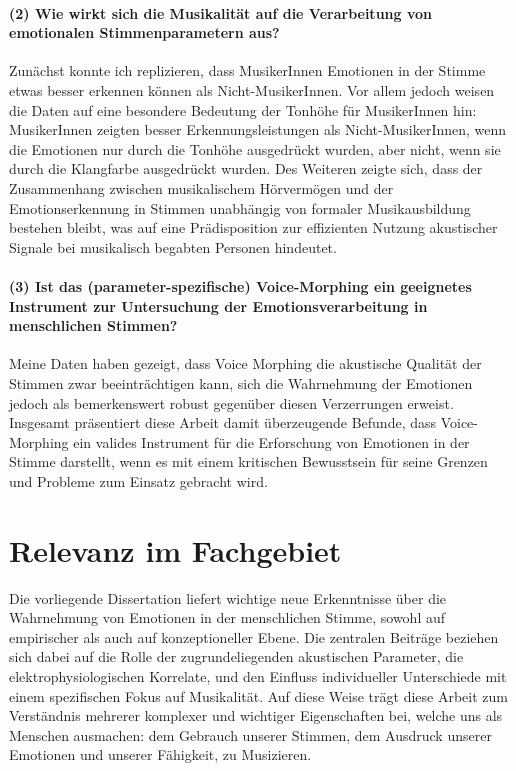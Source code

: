 \documentclass[11pt,a4paper,sans]{moderncv} %
\begin{document}
\paragraph{(2)	Wie wirkt sich die Musikalität auf die Verarbeitung von emotionalen Stimmenparametern aus?}

Zunächst konnte ich replizieren, dass MusikerInnen Emotionen in der Stimme etwas besser erkennen können als Nicht-MusikerInnen. Vor allem jedoch weisen die Daten auf eine besondere Bedeutung der Tonhöhe für MusikerInnen hin: MusikerInnen zeigten besser Erkennungsleistungen als Nicht-MusikerInnen, wenn die Emotionen nur durch die Tonhöhe ausgedrückt wurden, aber nicht, wenn sie durch die Klangfarbe ausgedrückt wurden. Des Weiteren zeigte sich, dass der Zusammenhang zwischen musikalischem Hörvermögen und der Emotionserkennung in Stimmen unabhängig von formaler Musikausbildung bestehen bleibt, was auf eine Prädisposition zur effizienten Nutzung akustischer Signale bei musikalisch begabten Personen hindeutet.

\paragraph{(3)	Ist das (parameter-spezifische) Voice-Morphing ein geeignetes Instrument zur Untersuchung der Emotionsverarbeitung in menschlichen Stimmen?}

Meine Daten haben gezeigt, dass Voice Morphing die akustische Qualität der Stimmen zwar beeinträchtigen kann, sich die Wahrnehmung der Emotionen jedoch als bemerkenswert robust gegenüber diesen Verzerrungen erweist. Insgesamt präsentiert diese Arbeit damit überzeugende Befunde, dass Voice-Morphing ein valides Instrument für die Erforschung von Emotionen in der Stimme darstellt, wenn es mit einem kritischen Bewusstsein für seine Grenzen und Probleme zum Einsatz gebracht wird.

\section{Relevanz im Fachgebiet}

Die vorliegende Dissertation liefert wichtige neue Erkenntnisse über die Wahrnehmung
von Emotionen in der menschlichen Stimme, sowohl auf empirischer als auch auf konzeptioneller
Ebene. Die zentralen Beiträge beziehen sich dabei auf die Rolle der zugrundeliegenden akustischen
Parameter, die elektrophysiologischen Korrelate, und den Einfluss individueller Unterschiede mit
einem spezifischen Fokus auf Musikalität. Auf diese Weise trägt diese Arbeit zum Verständnis
mehrerer komplexer und wichtiger Eigenschaften bei, welche uns als Menschen ausmachen:
dem Gebrauch unserer Stimmen, dem Ausdruck unserer Emotionen und unserer Fähigkeit, zu
Musizieren. 
\end{document}

